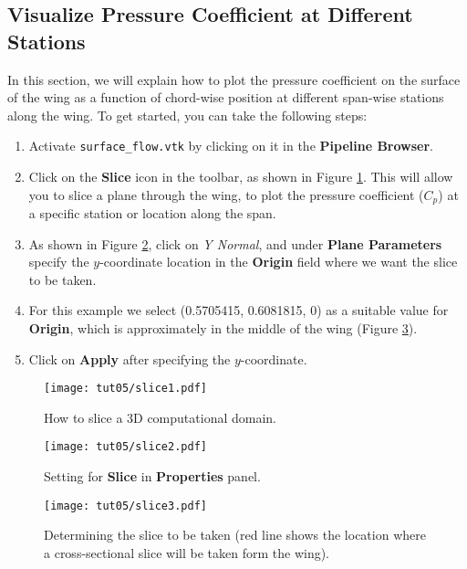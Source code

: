 \subsection{Visualize Pressure Coefficient at Different Stations}
In this section, we will explain how to plot the pressure coefficient on the surface of the wing as a function of chord-wise position at different span-wise stations along the wing. To get started, you can take the following steps:
\begin{enumerate}[label=\arabic*)]
	\setcounter{enumi}{0}
	\item Activate \texttt{surface\_flow.vtk} by clicking on it in the \textbf{Pipeline Browser}.
	\item Click on the \textbf{Slice} icon in the toolbar, as shown in Figure \ref{fig5:slice1}. This will allow you to slice a plane through the wing, to plot the pressure coefficient ($C_p$) at a specific station or location along the span.
	\item As shown in Figure \ref{fig5:slice2}, click on \textit{Y Normal}, and under \textbf{Plane Parameters} specify the $y$-coordinate location in the \textbf{Origin} field where we want the slice to be taken.
	\item For this example we select (0.5705415, 0.6081815, 0) as a suitable value for \textbf{Origin}, which is approximately in the middle of the wing (Figure \ref{fig5:slice3}).
	\item Click on \textbf{Apply} after specifying the $y$-coordinate.
\end{enumerate}
\begin{figure}[ht]
    \centering
    \texttt{[image: tut05/slice1.pdf]}
    \caption{How to slice a 3D computational domain.}
    \label{fig5:slice1}
\end{figure}
\begin{figure}[ht]
    \centering
    \texttt{[image: tut05/slice2.pdf]}
    \caption{Setting for \textbf{Slice} in \textbf{Properties} panel.}
    \label{fig5:slice2}
\end{figure}
\begin{figure}[H]
    \centering
    \texttt{[image: tut05/slice3.pdf]}
    \caption{Determining the slice to be taken (red line shows the location where a cross-sectional slice will be taken form the wing).}
    \label{fig5:slice3}
\end{figure}

